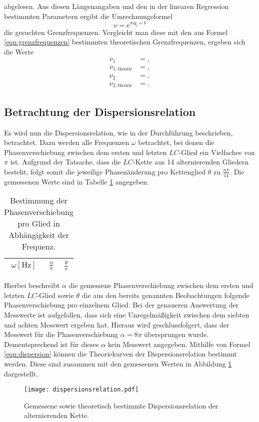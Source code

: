 abgelesen.
Aus diesen Längenangaben und den in der linearen Regression bestimmten Parametern ergibt die Umrechnungsformel
\begin{equation}
  \nu = \mathrm{e}^{m g_i + b}
\end{equation}
die gesuchten Grenzfrequenzen.
Vergleicht man diese mit den aus Formel \ref{eqn:grenzfrequenzen} bestimmten theoretischen Grenzfrequenzen, ergeben sich die Werte
\begin{align*}
  \nu_{1} &= , \\
  \nu_{1, \text{theorie}} &= , \\
  \nu_{2} &= , \\
  \nu_{2, \text{theorie}} &= .
\end{align*}


\subsection{Betrachtung der Dispersionsrelation}
\label{sec:dis}
Es wird nun die Dispersionsrelation, wie in der Durchführung beschrieben, betrachtet.
Dazu werden alle Frequenzen $\omega$ betrachtet, bei denen die Phasenverschiebung zwischen dem ersten und letzten $LC$-Glied ein Vielfaches von $\pi$ ist.
Aufgrund der Tatsache, dass die $LC$-Kette aus 14 alternierenden Gliedern besteht, folgt somit die jeweilige Phasenänderung pro Kettenglied $\theta$ zu $\frac{n \pi}{14}$.
Die gemessenen Werte sind in Tabelle \ref{tab:dispersion} angegeben.
\begin{table}
  \centering
  \caption{Bestimmung der Phasenverschiebung pro Glied in Abhängigkeit der Frequenz.}
  \label{tab:dispersion}
  \begin{tabular}{c c c}
    \toprule
    {$\omega [\si{\hertz}]$} & {$\frac{\alpha}{\pi} $} & {$\frac{\theta}{\pi} $}\\
    \midrule
    
    \bottomrule
  \end{tabular}
\end{table}
Hierbei beschreibt $\alpha$ die gemessene Phasenverschiebung zwischen dem ersten und letzten $LC$-Glied sowie $\theta$ die aus den bereits genannten Beobachtungen folgende Phasenverschiebung pro einzelnem Glied.
Bei der genaueren Auswertung der Messwerte ist aufgefallen, dass sich eine Unregelmäßigkeit zwischen dem siebten und achten Messwert ergeben hat.
Hieraus wird geschlussfolgert, dass der Messwert für die Phasenverschiebung $\alpha = 8 \pi$ übersprungen wurde.
Dementsprechend ist für dieses $\alpha$ kein Messwert angegeben.
Mithilfe von Formel \ref{eqn:dispersion} können die Theoriekurven der Dispersionsrelation bestimmt werden.
Diese sind zusammen mit den gemessenen Werten in Abbildung \ref{fig:dispersion_fertig} dargestellt.
\begin{figure}[H]
  \centering
  \texttt{[image: dispersionsrelation.pdf]}
  \caption{Gemessene sowie theoretisch bestimmte Dispersionsrelation der alternierenden Kette.}
  \label{fig:dispersion_fertig}
\end{figure}

